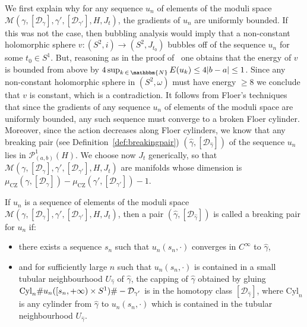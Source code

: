 \documentclass[AHL,Unicode,longabstracts,published]{cedram}
\newcommand{\N}{\mathbbm{N}}
\newcommand{\Cyl}{\mathrm{Cyl}}
\newcommand{\rCZ}{\mathrm{CZ}}
\newcommand{\clP}{\mathcal{P}}
\newcommand{\clM}{\mathcal{M}}
\newcommand{\clD}{\mathcal{D}}
\begin{document}
We first explain why for any sequence $u_n$ of elements of the moduli space \linebreak $\clM(\gamma, [\clD_\gamma],\gamma', [\clD_{\gamma'}],H,J_t)$, the gradients of $u_n$ are uniformly bounded. If this was not the case, then bubbling analysis would imply that a non-constant holomorphic sphere $v: (S^2,i) \to (S^2,J_{t_0})$ bubbles off of the sequence $u_n$ for some $t_0 \in S^1$. But, reasoning as in the proof of~\cite[Lemma~6.6.2]{AD} one obtains that the energy of $v$ is bounded from above by $4\sup_{k\, \in\,\N}E(u_k) \leq 4|b-a| \leq 1$. Since any non-constant holomorphic sphere in $(S^2,\omega)$ must have energy $ \geq 8$ we conclude that $v$ is constant, which is a contradiction. It follows from Floer's techniques~\cite{Floer} that since the gradients of any sequence $u_n$ of elements of the moduli space are uniformly bounded, any such sequence must converge to a broken Floer cylinder. Moreover, since the action decreases along Floer cylinders, we know that any breaking pair (see Definition~\ref{def:breakingpair}) $(\widehat \gamma,[\clD_{\widehat \gamma}])$ of the sequence $u_n$ lies in $\clP^1_{(a,b)}(H)$. We choose now $J_t$ generically, so that $\clM(\gamma, [\clD_\gamma],\gamma', [\clD_{\gamma'}],H,J_t)$ are manifolds whose dimension is $\mu_{\rCZ}(\gamma, [\clD_\gamma])- \mu_{\rCZ}(\gamma', [\clD_{\gamma'}]) -1$.

\begin{defi} \label{def:breakingpair}
If $u_n$ is a sequence of elements of the moduli space \linebreak $\clM(\gamma, [\clD_\gamma],\gamma', [\clD_{\gamma'}],H,J_t)$, then a pair $(\widehat \gamma,[\clD_{\widehat \gamma}])$ is called a breaking pair for $u_n$ if:
\begin{itemize}
\item there exists a sequence $s_n$ such that $u_n(s_n,\cdot)$ converges in $C^\infty$ to $\widehat \gamma$,
\item and for sufficiently large $n$ such that $u_n(s_n,\cdot)$ is contained in a small tubular neighbourhood $U_{\widehat \gamma}$ of $\widehat \gamma$, the capping of $\widehat \gamma$ obtained by gluing $\Cyl_n \# u_n([s_n,+\infty)\linebreak \times S^1) \# - \clD_{\gamma'} $ is in the homotopy class $[\clD_{\widehat \gamma}]$, where $\Cyl_n$ is any cylinder from $\widehat \gamma$ to $u_n(s_n,\cdot)$ which is contained in the tubular neighbourhood $U_{\widehat \gamma}$.
\end{itemize}
\end{defi}
\end{document}
